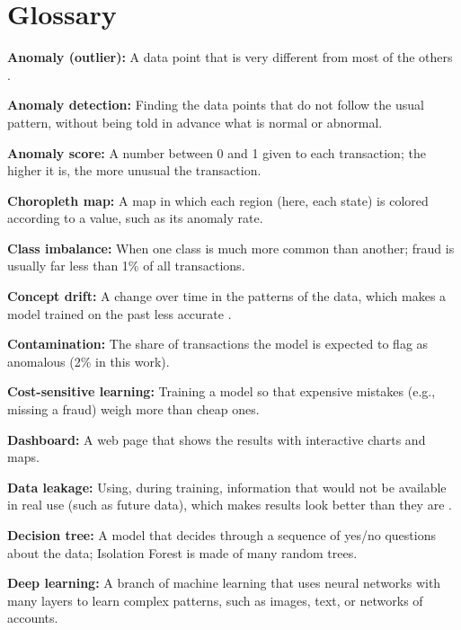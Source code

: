 \documentclass[journal]{IEEEtran}
\begin{document}

\section{Glossary}
\label{sec:glossary}

\begingroup
\footnotesize
\setlength{\parindent}{0pt}
\setlength{\parskip}{3pt}

\textbf{Anomaly (outlier):} A data point that is very different from most of the others \cite{chandola2009anomaly}.

\textbf{Anomaly detection:} Finding the data points that do not follow the usual pattern, without being told in advance what is normal or abnormal.

\textbf{Anomaly score:} A number between 0 and 1 given to each transaction; the higher it is, the more unusual the transaction.

\textbf{Choropleth map:} A map in which each region (here, each state) is colored according to a value, such as its anomaly rate.

\textbf{Class imbalance:} When one class is much more common than another; fraud is usually far less than 1\% of all transactions.

\textbf{Concept drift:} A change over time in the patterns of the data, which makes a model trained on the past less accurate \cite{gama2014survey}.

\textbf{Contamination:} The share of transactions the model is expected to flag as anomalous (2\% in this work).

\textbf{Cost-sensitive learning:} Training a model so that expensive mistakes (e.g., missing a fraud) weigh more than cheap ones.

\textbf{Dashboard:} A web page that shows the results with interactive charts and maps.

\textbf{Data leakage:} Using, during training, information that would not be available in real use (such as future data), which makes results look better than they are \cite{kaufman2012leakage}.

\textbf{Decision tree:} A model that decides through a sequence of yes/no questions about the data; Isolation Forest is made of many random trees.

\textbf{Deep learning:} A branch of machine learning that uses neural networks with many layers to learn complex patterns, such as images, text, or networks of accounts.
\end{document}
